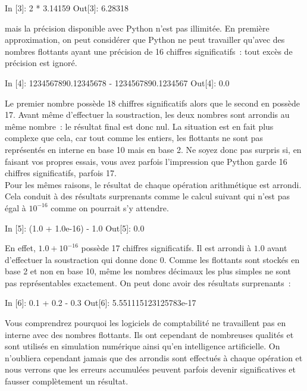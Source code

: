 \documentclass{magnolia}
\begin{document}
\begin{pythoncode}
In [3]: 2 * 3.14159
Out[3]: 6.28318
\end{pythoncode}
 
\noindent mais la précision disponible avec Python n'est pas illimitée. En première approximation,
on peut considérer que Python ne peut travailler qu'avec des nombres flottants ayant
une précision de 16 chiffres significatifs~: tout excès de précision est ignoré.

\begin{pythoncode}
In [4]: 1234567890.12345678 - 1234567890.1234567
Out[4]: 0.0
\end{pythoncode}

\noindent Le premier nombre possède 18 chiffres
significatifs alors que le second en possède 17. Avant même d'effectuer la soustraction, les deux
nombres sont arrondis au même nombre~: le résultat final est donc nul. La situation est
en fait plus complexe que cela, car tout comme les entiers, les flottants ne sont pas
représentés en interne en base 10 mais en base 2. Ne soyez donc pas surpris si, en faisant vos propres
essais, vous avez parfois l'impression que Python garde 16 chiffres significatifs,
parfois 17.\\

Pour les mêmes raisons, le résultat de chaque opération arithmétique est arrondi. Cela 
conduit à des résultats surprenants comme le calcul suivant qui n'est pas égal à
$10^{-16}$ comme on pourrait s'y attendre.

\begin{pythoncode}
In [5]: (1.0 + 1.0e-16) - 1.0
Out[5]: 0.0
\end{pythoncode}

\noindent En effet, $1.0 + 10^{-16}$ possède 17 chiffres significatifs. Il est arrondi
à $1.0$ avant d'effectuer la soustraction qui donne donc 0. Comme les
flottants sont stockés en base 2 et non en base 10, même les nombres décimaux les plus
simples ne sont pas représentables exactement. On peut donc avoir des résultats
surprenants~:

\begin{pythoncode}
In [6]: 0.1 + 0.2 - 0.3
Out[6]: 5.551115123125783e-17
\end{pythoncode}

\noindent Vous comprendrez pourquoi les logiciels de comptabilité ne travaillent pas en
interne avec des nombres flottants. Ils ont cependant de nombreuses qualités et sont utilisés en simulation numérique ainsi qu'en intelligence artificielle. On n'oubliera cependant jamais que des arrondis sont effectués à
chaque opération et nous verrons que les erreurs accumulées peuvent parfois devenir 
significatives et fausser complètement un résultat.\\
\end{document}
